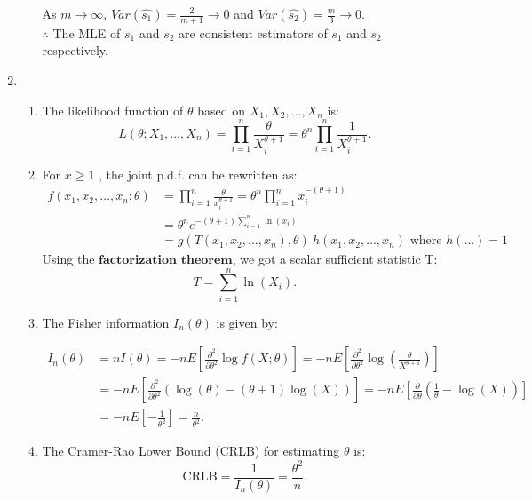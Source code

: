 \documentclass{article}
\begin{document}
\begin{enumerate}
\begin{enumerate}[label=(\roman*)]
    As $m \to \infty$, $Var(\hat{s_1}) = \frac{2}{m+1} \to 0$ and $Var(\hat{s_2}) = \frac{m}{3} \to 0$. \\
    $\therefore$ The MLE of $s_1$ and $s_2$ are consistent estimators of $s_1$ and $s_2$ respectively.

    \end{enumerate}


\item
    \begin{enumerate}[label=(\roman*)]

    \item The likelihood function of $\theta$ based on $X_1, X_2, \dots, X_n$ is:
    \[
    L(\theta; X_1, \dots, X_n) = \prod_{i=1}^n \frac{\theta}{X_i^{\theta + 1}} = \theta^n \prod_{i=1}^n \frac{1}{X_i^{\theta + 1}}.
    \]

    \item For $x \geq 1$ , the joint p.d.f. can be rewritten as:
    \begin{align*}
    f(x_1, x_2, \dots, x_n; \theta) &= \prod_{i=1}^n \frac{\theta}{x_i^{\theta + 1}} = \theta^n \prod_{i=1}^n {x_i^{-(\theta + 1)}} \\
    &= \theta^n e^{-(\theta + 1) \sum_{i=1}^n \ln(x_i)} \\
    &= g(T(x_1, x_2, \dots, x_n), \theta) \ h(x_1, x_2, \dots, x_n) \text{ where } h(\dots) = 1
    \end{align*}
    Using the $\textbf{factorization theorem}$, we got a scalar sufficient statistic T:
    \[
    T = \sum_{i=1}^n \ln(X_i).
    \]

    \item The Fisher information \( I_n(\theta) \) is given by:

    \begin{align*}
    I_n(\theta) &= nI(\theta) = -nE\left[ \frac{\partial^2}{\partial \theta^2} \log f(X; \theta) \right] = -nE\left[ \frac{\partial^2}{\partial \theta^2} \log \left( \frac{\theta}{X^{\theta + 1}} \right) \right] \\
    &= -nE\left[ \frac{\partial^2}{\partial \theta^2} (\log(\theta) - (\theta + 1) \log(X)) \right] = -nE\left[ \frac{\partial}{\partial \theta} \left( \frac{1}{\theta} - \log(X) \right) \right] \\
    &= -nE\left[ -\frac{1}{\theta^2} \right] = \frac{n}{\theta^2}.
    \end{align*}

    \item The Cramer-Rao Lower Bound (CRLB) for estimating \( \theta \) is:
    \[
    \text{CRLB} = \frac{1}{I_n(\theta)} = \frac{\theta^2}{n}.
    \]


\end{enumerate}
\end{enumerate}
\end{document}
